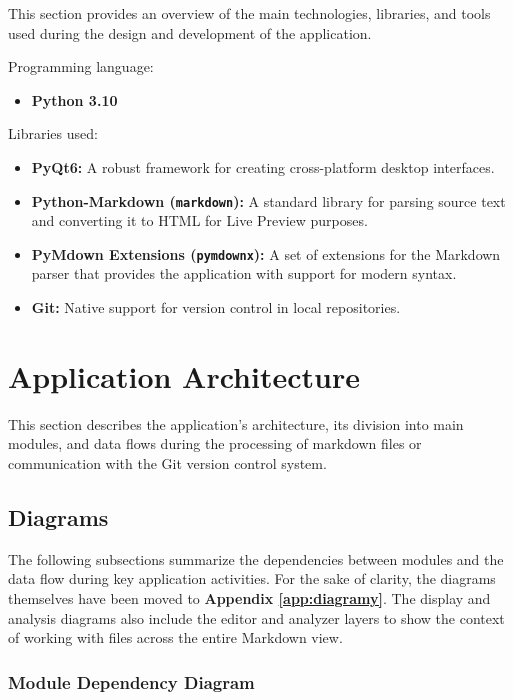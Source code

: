 \documentclass[12pt, a4paper]{article}
\begin{document}
This section provides an overview of the main technologies, libraries, and tools used during the design 
and development of the application.

Programming language:
\begin{itemize}
    \item \textbf{Python 3.10}
\end{itemize}

Libraries used:
\begin{itemize}
    \item \textbf{PyQt6:} A robust framework for creating cross-platform desktop interfaces.
    \item \textbf{Python-Markdown (\texttt{markdown}):} A standard library for parsing source text and converting it to HTML for Live Preview purposes.
    \item \textbf{PyMdown Extensions (\texttt{pymdownx}):} A set of extensions for the Markdown parser that provides the application with support for modern syntax.
    \item \textbf{Git:} Native support for version control in local repositories.
\end{itemize}

\section{Application Architecture}

This section describes the application's architecture, its division into main modules, 
and data flows during the processing of markdown files or communication with the Git version control system.

\subsection{Diagrams}

The following subsections summarize the dependencies between modules and the data flow during key 
application activities. For the sake of clarity, the diagrams themselves have been moved to 
\textbf{Appendix \ref{app:diagramy}}. The display and analysis diagrams also include the editor 
and analyzer layers to show the context of working with files across the entire Markdown view.

\subsubsection*{Module Dependency Diagram}
\end{document}
